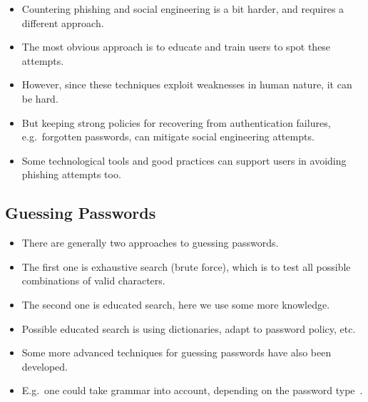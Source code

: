 \documentclass{beamer}
\begin{document}
\begin{frame}{\insertsubsectionhead}
  \begin{itemize}
    \item Countering phishing and social engineering is a bit harder, and 
      requires a different approach.

    \item The most obvious approach is to educate and train users to spot these 
      attempts.

    \item However, since these techniques exploit weaknesses in human nature, 
      it can be hard.

    \item But keeping strong policies for recovering from authentication 
      failures, e.g.\ forgotten passwords, can mitigate social engineering 
      attempts.

    \item Some technological tools and good practices can support users in 
      avoiding phishing attempts too.
  \end{itemize}
\end{frame}

\subsection{Guessing Passwords}

\begin{frame}{\insertsubsectionhead}
  \begin{itemize}
    \item There are generally two approaches to guessing passwords.

    \item The first one is exhaustive search (brute force), which is to test 
      all possible combinations of valid characters.

    \item The second one is educated search, here we use some more knowledge.
  \end{itemize}
\end{frame}

\begin{frame}{\insertsubsectionhead}
  \begin{itemize}
    \item Possible educated search is using dictionaries, adapt to password 
      policy, etc.

    \item Some more advanced techniques for guessing passwords have also been 
      developed.

    \item E.g.\ one could take grammar into account, depending on the password 
      type~\cite{Bonneau2012ghs,Bonneau2012lpo}.
  \end{itemize}
\end{frame}
\end{document}

